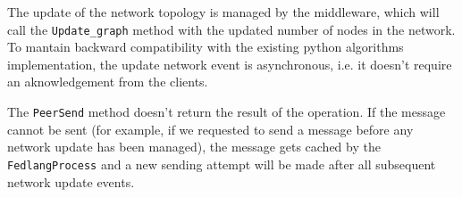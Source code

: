 The update of the network topology is managed by the middleware, which will call the \texttt{Update\_graph} method with the updated number of nodes in the network.
To mantain backward compatibility with the existing python algorithms implementation, the update network event is asynchronous, i.e. it doesn't require an aknowledgement from the clients.

The \texttt{PeerSend} method doesn't return the result of the operation. If the message cannot be sent (for example, if we requested to send a message before any network update has been managed), the message gets cached by the \texttt{FedlangProcess} and a new sending attempt will be made after all subsequent network update events.
